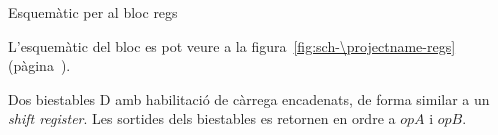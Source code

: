 \begin{contendfig}
  \begin{center}
  \end{center}
  \caption{\label{fig:sch-\projectname-regs} Esquemàtic per al bloc \textsf{regs}}
\end{contendfig}

L'esquemàtic del bloc es pot veure a la figura~\ref{fig:sch-\projectname-regs} (pàgina~\pageref{fig:sch-\projectname-regs}).

Dos biestables D amb habilitació de càrrega encadenats, de forma similar a un \emph{shift
register}. Les sortides dels biestables es retornen en ordre a $opA$ i $opB$.

\vspace{1cm}
